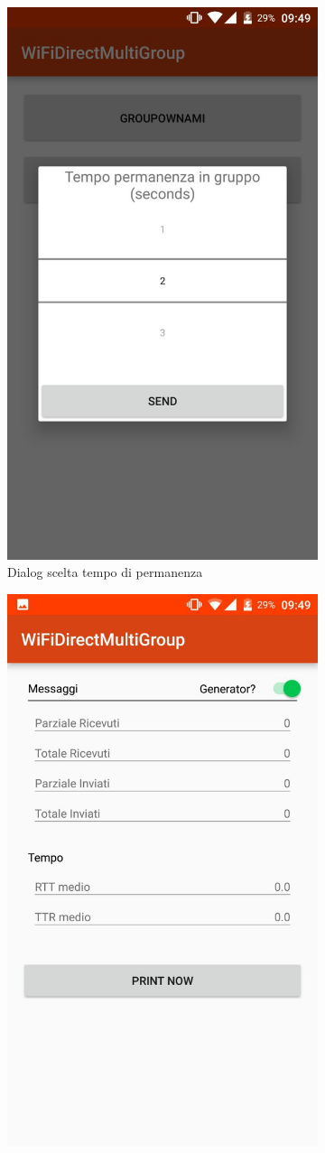 \documentclass{llncs}
\begin{document}
\begin{figure}
\begin{subfigure}{.33\textwidth}
		\includegraphics[width=.7\linewidth]{img/gui-dialog.jpg}
		\caption{Dialog scelta tempo di permanenza}
		\label{fig:sub2}
	\end{subfigure}
	\begin{subfigure}{.33\textwidth}
		\centering
		\includegraphics[width=.7\linewidth]{img/gui-report.jpg}

\end{subfigure}
\end{figure}
\end{document}
